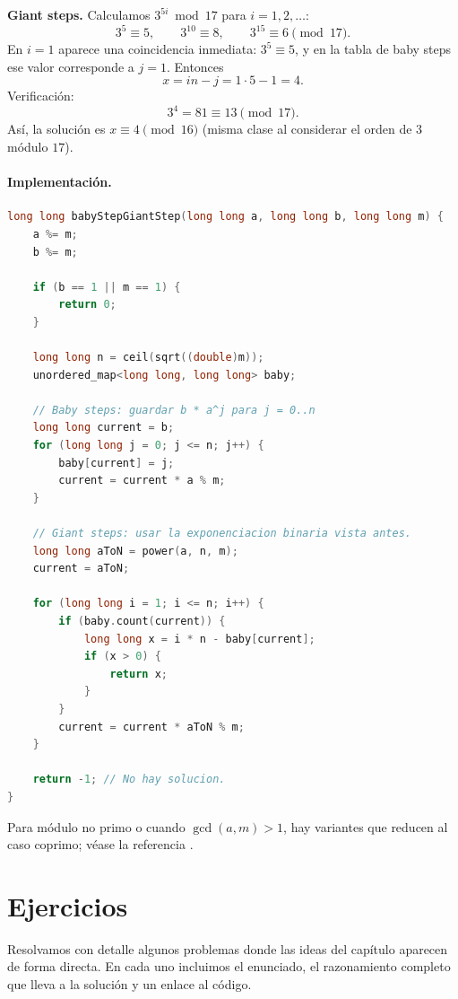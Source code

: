 \textbf{Giant steps.} Calculamos $3^{5i}\bmod 17$ para $i=1,2,\ldots$:
\[
3^5 \equiv 5,\qquad 3^{10}\equiv 8,\qquad 3^{15}\equiv 6 \pmod{17}.
\]
En $i=1$ aparece una coincidencia inmediata: $3^5 \equiv 5$, y en la tabla de baby steps ese valor corresponde a $j=1$. Entonces
\[
x = in-j = 1\cdot 5 - 1 = 4.
\]
Verificación:
\[
3^4 = 81 \equiv 13 \pmod{17}.
\]
Así, la solución es $x\equiv 4 \pmod{16}$ (misma clase al considerar el orden de $3$ módulo $17$).

\paragraph{Implementación.}

\begin{lstlisting}[language=C++]
long long babyStepGiantStep(long long a, long long b, long long m) {
    a %= m;
    b %= m;

    if (b == 1 || m == 1) {
        return 0;
    }

    long long n = ceil(sqrt((double)m));
    unordered_map<long long, long long> baby;

    // Baby steps: guardar b * a^j para j = 0..n
    long long current = b;
    for (long long j = 0; j <= n; j++) {
        baby[current] = j;
        current = current * a % m;
    }

    // Giant steps: usar la exponenciacion binaria vista antes.
    long long aToN = power(a, n, m);
    current = aToN;

    for (long long i = 1; i <= n; i++) {
        if (baby.count(current)) {
            long long x = i * n - baby[current];
            if (x > 0) {
                return x;
            }
        }
        current = current * aToN % m;
    }

    return -1; // No hay solucion.
}
\end{lstlisting}

Para módulo no primo o cuando $\gcd(a,m) > 1$, hay variantes que reducen al caso coprimo; véase la referencia \cite{cpalg-discrete-log-general}.

\section{Ejercicios}

Resolvamos con detalle algunos problemas donde las ideas del capítulo aparecen de forma directa. En cada uno incluimos el enunciado, el razonamiento completo que lleva a la solución y un enlace al código.

